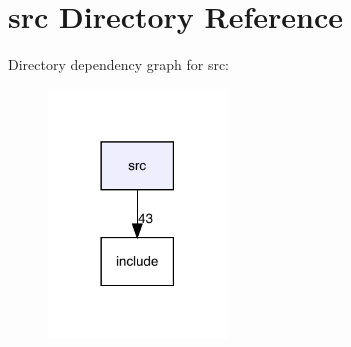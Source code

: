 \section{src Directory Reference}
\label{dir_68267d1309a1af8e8297ef4c3efbcdba}
Directory dependency graph for src\+:\nopagebreak
\begin{figure}[H]
\begin{center}
\leavevmode
\includegraphics[width=134pt]{dir_68267d1309a1af8e8297ef4c3efbcdba_dep}
\end{center}
\end{figure}
